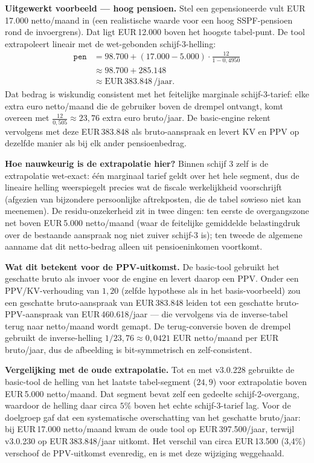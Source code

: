 \documentclass[11pt,a4paper]{article}
\newcommand{\code}[1]{\texttt{#1}}
\begin{document}
\textbf{Uitgewerkt voorbeeld --- hoog pensioen.} Stel een gepensioneerde vult EUR\,17.000 netto/maand in (een realistische waarde voor een hoog SSPF-pensioen rond de invoergrens). Dat ligt EUR\,12.000 boven het hoogste tabel-punt. De tool extrapoleert lineair met de wet-gebonden schijf-3-helling:
\begin{align}
\code{pen} &= 98.700 + (17.000 - 5.000) \cdot \tfrac{12}{1 - 0{,}4950} \\
           &\approx 98.700 + 285.148 \\
           &\approx \text{EUR}\,383.848 \,/\text{jaar}.
\end{align}
Dat bedrag is wiskundig consistent met het feitelijke marginale schijf-3-tarief: elke extra euro netto/maand die de gebruiker boven de drempel ontvangt, komt overeen met $\tfrac{12}{0{,}505} \approx 23{,}76$ extra euro bruto/jaar. De basic-engine rekent vervolgens met deze EUR\,383.848 als bruto-aanspraak en levert KV en PPV op dezelfde manier als bij elk ander pensioenbedrag.

\textbf{Hoe nauwkeurig is de extrapolatie hier?} Binnen schijf 3 zelf is de extrapolatie wet-exact: één marginaal tarief geldt over het hele segment, dus de lineaire helling weerspiegelt precies wat de fiscale werkelijkheid voorschrijft (afgezien van bijzondere persoonlijke aftrekposten, die de tabel sowieso niet kan meenemen). De residu-onzekerheid zit in twee dingen: ten eerste de overgangszone net boven EUR\,5.000 netto/maand (waar de feitelijke gemiddelde belastingdruk over de bestaande aanspraak nog niet zuiver schijf-3 is); ten tweede de algemene aanname dat dit netto-bedrag alleen uit pensioeninkomen voortkomt.

\textbf{Wat dit betekent voor de PPV-uitkomst.} De basic-tool gebruikt het geschatte bruto als invoer voor de engine en levert daarop een PPV. Onder een PPV/KV-verhouding van $1{,}20$ (zelfde hypothese als in het basis-voorbeeld) zou een geschatte bruto-aanspraak van EUR\,383.848 leiden tot een geschatte bruto-PPV-aanspraak van EUR\,460.618/jaar --- die vervolgens via de inverse-tabel terug naar netto/maand wordt gemapt. De terug-conversie boven de drempel gebruikt de inverse-helling $1 / 23{,}76 \approx 0{,}0421$ EUR netto/maand per EUR bruto/jaar, dus de afbeelding is bit-symmetrisch en zelf-consistent.

\textbf{Vergelijking met de oude extrapolatie.} Tot en met v3.0.228 gebruikte de basic-tool de helling van het laatste tabel-segment ($24{,}9$) voor extrapolatie boven EUR\,5.000 netto/maand. Dat segment bevat zelf een gedeelte schijf-2-overgang, waardoor de helling daar circa $5\%$ boven het echte schijf-3-tarief lag. Voor de doelgroep gaf dat een systematische overschatting van het geschatte bruto/jaar: bij EUR\,17.000 netto/maand kwam de oude tool op EUR\,397.500/jaar, terwijl v3.0.230 op EUR\,383.848/jaar uitkomt. Het verschil van circa EUR\,13.500 (3,4\%) verschoof de PPV-uitkomst evenredig, en is met deze wijziging weggehaald.
\end{document}
